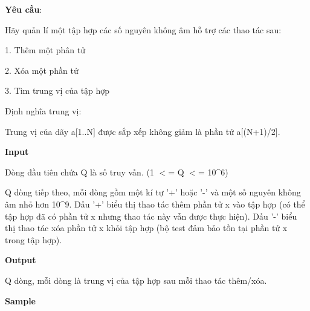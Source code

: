 




\textbf{Yêu cầu}:

Hãy quản lí một tập hợp các số nguyên không âm hỗ trợ các thao tác sau:

 1. Thêm một phân tử

 2. Xóa một phần tử

 3. Tìm trung vị của tập hợp




Định nghĩa trung vị:

Trung vị của dãy a[1..N] được sắp xếp không giảm là phần tử a[(N+1)/2].




\textbf{Input}

Dòng đầu tiên chứa Q là số truy vấn. (1 $<$= Q $<$= 10\textasciicircum6)

Q dòng tiếp theo, mỗi dòng gồm một kí tự '+' hoặc '-' và một số nguyên không âm nhỏ hơn 10\textasciicircum9. Dấu '+' biểu thị thao tác thêm phần tử x vào tập hợp (có thể tập hợp đã có phần tử x nhưng thao tác này vẫn được thực hiện). Dấu '-' biểu thị thao tác xóa phần tử x khỏi tập hợp (bộ test đảm bảo tồn tại phần tử x trong tập hợp).




\textbf{Output}

Q dòng, mỗi dòng là trung vị của tập hợp sau mỗi thao tác thêm/xóa.




\textbf{Sample}



